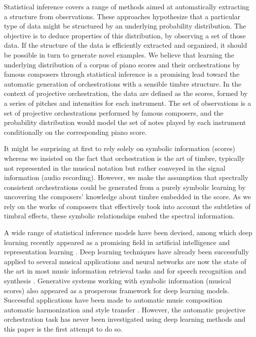 \documentclass{article}
\begin{document}
Statistical inference covers a range of methods aimed at automatically extracting a structure from observations. These approaches hypothesize that a particular type of data might be structured by an underlying probability distribution. The objective is to deduce properties of this distribution, by observing a set of those data. 
If the structure of the data is efficiently extracted and organized, it should be possible in turn to generate novel examples.
We believe that learning the underlying distribution of a corpus of piano scores and their orchestrations by famous composers through statistical inference is a promising lead toward the automatic generation of orchestrations with a sensible timbre structure.
In the context of projective orchestration, the data are defined as the scores, formed by a series of pitches and intensities for each instrument. The set of observations is a set of projective orchestrations performed by famous composers, and the probability distribution would model the set of notes played by each instrument conditionally on the corresponding piano score.

It might be surprising at first to rely solely on symbolic information (scores) whereas we insisted on the fact that orchestration is the art of timbre, typically not represented in the musical notation but rather conveyed in the signal information (audio recording).
However, we make the assumption that spectrally consistent orchestrations could be generated from a purely symbolic learning by uncovering the composers' knowledge about timbre embedded in the score. As we rely on the works of composers that effectively took into account the subtleties of timbral effects, these symbolic relationships embed the spectral information.

A wide range of statistical inference models have been devised, among which deep learning recently appeared as a  promising field in artificial intelligence and representation learning \cite{bengio2013representation,LeCun:2015aa}.
Deep learning techniques have already been successfully applied to several musical applications and neural networks are now the state of the art in most music information retrieval tasks \cite{humphrey2012moving,lee2011unsupervised,boulanger2013audio} and for speech recognition and synthesis \cite{hinton2012deep,DBLP:journals/corr/OordDZSVGKSK16}. Generative systems working with symbolic information (musical scores) also appeared as a prosperous framework for deep learning models. Successful applications have been made to automatic music composition \cite{eck2002finding,lavrenko2003polyphonic,bosley2010learning,boulanger2012modeling,Johnson2015}
automatic harmonization \cite{Sun} and style transfer \cite{Pachet2016}. However, the automatic projective orchestration task has never been investigated using deep learning methods and this paper is the first attempt to do so.
\end{document}
